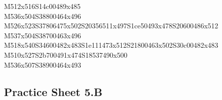 \documentclass{article}
\begin{document}
\begin{multicols}{5}
\begin{center}
M512x516S14c00489x485 %
\\M536x504S38800464x496 %
\\M526x523S37806475x502S20356511x497S1ce50493x478S20600486x512 %
\\M537x504S38700463x496 %
\\M518x540S34600482x483S1e111473x512S21800463x502S30c00482x483 %
\\M510x527S2b700491x474S18537490x500 %
\\M536x507S38900464x493 %
\vfil

\end{center}
\end{multicols}

\subsection{Practice Sheet 5.B}
\end{document}
